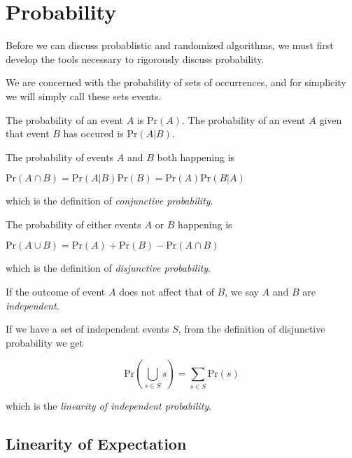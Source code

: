 \renewcommand{\Pr}{\text{Pr}}
\newcommand{\Var}{\text{Var}}

\chapter{Probability}

Before we can discuss probablistic and randomized algorithms, we must
first develop the tools necessary to rigorously discuss probability.

We are concerned with the probability of sets of occurrences, and for
simplicity we will simply call these sets events.

The probability of an event $A$ is $\Pr(A)$.  The probability of an
event $A$ given that event $B$ has occured is $\Pr(A | B)$.

The probability of events $A$ and $B$ both happening is

\begin{center}
\begin{math}
\Pr(A \cap B)
= \Pr(A|B)\Pr(B) = \Pr(A)\Pr(B|A)
\end{math}
\end{center}

which is the definition of \emph{conjunctive probability}.

The probability of either events $A$ or $B$ happening is

\begin{center}
\begin{math}
  \Pr(A \cup B)
  = \Pr(A) + \Pr(B) - \Pr(A \cap B)
\end{math}
\end{center}

which is the definition of \emph{disjunctive probability}.

If the outcome of event $A$ does not affect that of $B$, we say $A$
and $B$ are \emph{independent}.

If we have a set of independent events $S$, from the definition of
disjunctive probability we get

\begin{displaymath}
  \Pr \left( \bigcup_{s \in S} s \right) = \sum_{s \in S} \Pr(s)
\end{displaymath}

which is the \emph{linearity of independent probability}.

\section{Linearity of Expectation}

